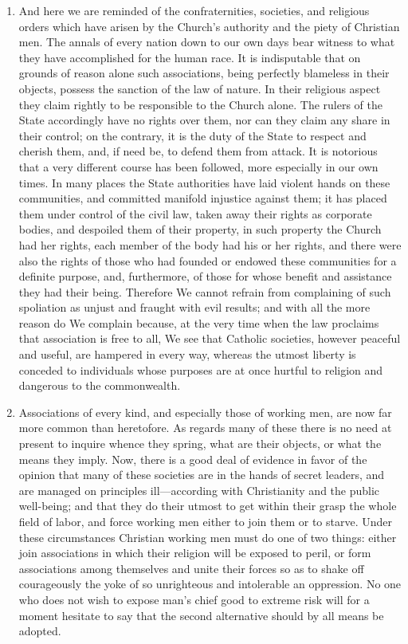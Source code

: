 \documentclass{book}
\begin{document}
\begin{enumerate}
	\item And here we are reminded of the confraternities, societies, and religious orders which have arisen by the Church’s authority and the piety of Christian men. The annals of every nation down to our own days bear witness to what they have accomplished for the human race. It is indisputable that on grounds of reason alone such associations, being perfectly blameless in their objects, possess the sanction of the law of nature. In their religious aspect they claim rightly to be responsible to the Church alone. The rulers of the State accordingly have no rights over them, nor can they claim any share in their control; on the contrary, it is the duty of the State to respect and cherish them, and, if need be, to defend them from attack. It is notorious that a very different course has been followed, more especially in our own times. In many places the State authorities have laid violent hands on these communities, and committed manifold injustice against them; it has placed them under control of the civil law, taken away their rights as corporate bodies, and despoiled them of their property, in such property the Church had her rights, each member of the body had his or her rights, and there were also the rights of those who had founded or endowed these communities for a definite purpose, and, furthermore, of those for whose benefit and assistance they had their being. Therefore We cannot refrain from complaining of such spoliation as unjust and fraught with evil results; and with all the more reason do We complain because, at the very time when the law proclaims that association is free to all, We see that Catholic societies, however peaceful and useful, are hampered in every way, whereas the utmost liberty is conceded to individuals whose purposes are at once hurtful to religion and dangerous to the commonwealth.


	\item Associations of every kind, and especially those of working men, are now far more common than heretofore. As regards many of these there is no need at present to inquire whence they spring, what are their objects, or what the means they imply. Now, there is a good deal of evidence in favor of the opinion that many of these societies are in the hands of secret leaders, and are managed on principles ill—according with Christianity and the public well-being; and that they do their utmost to get within their grasp the whole field of labor, and force working men either to join them or to starve. Under these circumstances Christian working men must do one of two things: either join associations in which their religion will be exposed to peril, or form associations among themselves and unite their forces so as to shake off courageously the yoke of so unrighteous and intolerable an oppression. No one who does not wish to expose man’s chief good to extreme risk will for a moment hesitate to say that the second alternative should by all means be adopted.



\end{enumerate}
\end{document}
